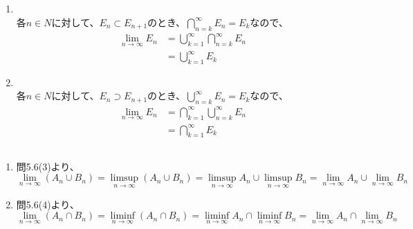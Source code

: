 \documentclass{jsarticle}
\begin{document}
\subsection{}
\begin{enumerate}
\item
　\\各$n\in N$に対して、$E_{n}\subset E_{n+1}$のとき、$\bigcap_{n=k}^{\infty}E_{n}=E_{k}$なので、
\begin{align*}
\lim_{n\to\infty}E_{n}&=\bigcup_{k=1}^{\infty}\bigcap_{n=k}^{\infty}E_{n}\\
&=\bigcup_{k=1}^{\infty}E_{k}
\end{align*}
\item
　\\各$n\in N$に対して、$E_{n}\supset E_{n+1}$のとき、$\bigcup_{n=k}^{\infty}E_{n}=E_{k}$なので、
\begin{align*}
\lim_{n\to\infty}E_{n}&=\bigcap_{k=1}^{\infty}\bigcup_{n=k}^{\infty}E_{n}\\
&=\bigcap_{k=1}^{\infty}E_{k}
\end{align*}

\end{enumerate}
\subsection{}
\begin{enumerate}
\item
問5.6(3)より、
\[\lim_{n\to\infty}(A_n \cup B_n)=\limsup_{n\to\infty}(A_n \cup B_n)=\limsup_{n\to\infty}A_n \cup \limsup_{n\to\infty}B_n=\lim_{n\to\infty}A_n\cup\lim_{n\to\infty}B_n\]
\item
問5.6(4)より、
\[\lim_{n\to\infty}(A_n \cap B_n)=\liminf_{n\to\infty}(A_n \cap B_n)=\liminf_{n\to\infty}A_n \cap \liminf_{n\to\infty}B_n=\lim_{n\to\infty}A_n\cap\lim_{n\to\infty}B_n\]
\end{enumerate}
\end{document}
